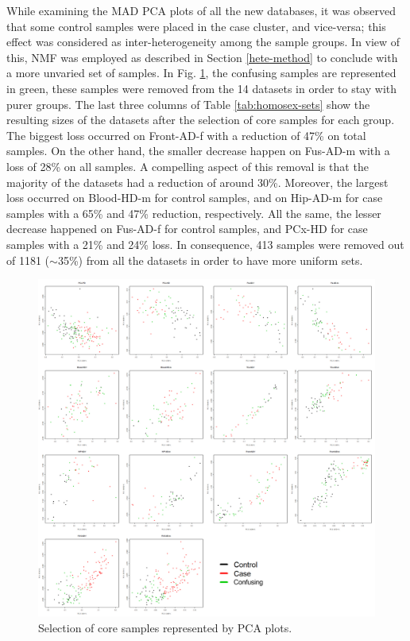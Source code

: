 While examining the MAD PCA plots of all the new databases, it was observed that some control samples were placed in the case cluster, and vice-versa; this effect was considered as inter-heterogeneity among the sample groups. In view of this, NMF was employed as described in Section \ref{hete-method} to conclude with a more unvaried set of samples. In Fig. \ref{fig:outliers-plots}, the confusing samples are represented in green, these samples were removed from the 14 datasets in order to stay with purer groups. The last three columns of Table \ref{tab:homosex-sets} show the resulting sizes of the datasets after the selection of core samples for each group. The biggest loss occurred on Front-AD-f with a reduction of 47\% on total samples. On the other hand, the smaller decrease happen on Fus-AD-m with a loss of 28\% on all samples. A compelling aspect of this removal is that the majority of the datasets had a reduction of around 30\%. Moreover, the largest loss occurred on Blood-HD-m for control samples, and on Hip-AD-m for case samples with a 65\% and 47\% reduction, respectively. All the same, the lesser decrease happened on Fus-AD-f for control samples, and PCx-HD for case samples with a 21\% and 24\% loss. In consequence, 413 samples were removed out of 1181 ($\sim$35\%) from all the datasets in order to have more uniform sets.

\begin{figure}[ht]
    \centerline{\includegraphics[width = 15cm]{Figures/outliers-removal.jpg}}
\caption{Selection of core samples represented by PCA plots.}
\label{fig:outliers-plots}
\end{figure}


